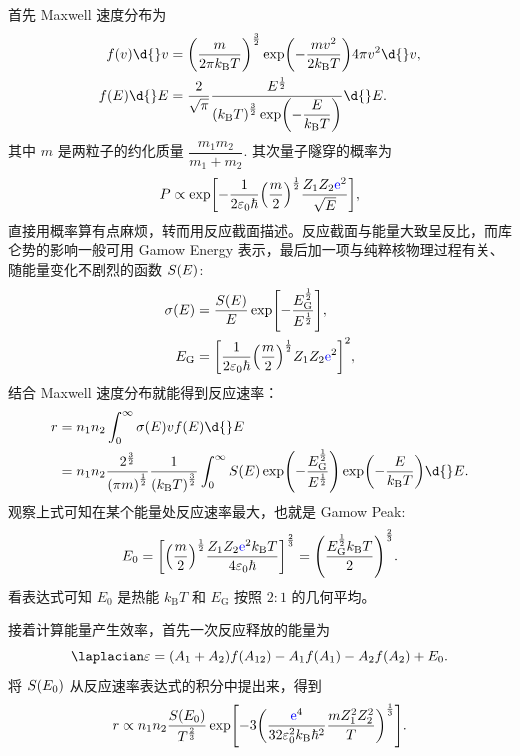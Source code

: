 \documentclass[../天体物理基础.tex]{subfiles}
\begin{document}
首先 Maxwell 速度分布为
\begin{align}
f\mleft(v\mright)\d{}v&=\mleft(\frac{m}{2\pi{}k_{\mathrm{B}}T}\mright)^{\frac{3}{2}}\exp\mleft(-\frac{mv^{2}}{2k_{\mathrm{B}}T}\mright) 4\pi v^{2}\d{}v,\\
f\mleft(E\mright)\d{}E&=\frac{2}{\sqrt{\pi}}\frac{E^{\frac{1}{2}}}{\mleft(k_{\mathrm{B}}T\mright)^{\frac{3}{2}}\exp\mleft(-\dfrac{E}{k_{\mathrm{B}}T}\mright)}\d{}E.
\end{align}
其中 $m$ 是两粒子的约化质量 $\dfrac{m_{1}m_{2}}{m_{1}+m_{2}}$. 其次量子隧穿的概率为
\begin{equation}
P\propto\exp\mleft[-\frac{1}{2\varepsilon_{0}\hbar}\mleft(\frac{m}{2}\mright)^{\frac{1}{2}}\frac{Z_{1}Z_{2}{\color{blue}{\ce{e}}}^{2}}{\sqrt{E}}\mright],
\end{equation}
直接用概率算有点麻烦，转而用反应截面描述。反应截面与能量大致呈反比，而库仑势的影响一般可用 Gamow Energy 表示，最后加一项与纯粹核物理过程有关、随能量变化不剧烈的函数 $S\mleft(E\mright)$:
\begin{align}
\sigma\mleft(E\mright)&=\frac{S\mleft(E\mright)}{E}\exp\mleft[-\frac{E_{\mathrm{G}}^{\frac{1}{2}}}{E^{\frac{1}{2}}}\mright],\\
E_{\mathrm{G}}&=\mleft[\frac{1}{2\varepsilon_{0}\hbar}\mleft(\frac{m}{2}\mright)^{\frac{1}{2}}Z_{1}Z_{2}{\color{blue}{\ce{e}}}^{2}\mright]^{2},
\end{align}
结合 Maxwell 速度分布就能得到反应速率：
\begin{align}
r&=n_{1}n_{2}\int_{0}^{\infty}\sigma\mleft(E\mright) vf\mleft(E\mright)\d{}E\notag\\
&=n_{1}n_{2}\frac{2^{\frac{3}{2}}}{\mleft(\pi m\mright)^{\frac{1}{2}}}\frac{1}{\mleft(k_{\mathrm{B}}T\mright)^{\frac{3}{2}}}\int_{0}^{\infty}S\mleft(E\mright)\exp\mleft(-\frac{E_{\mathrm{G}}^{\frac{1}{2}}}{E^{\frac{1}{2}}}\mright)\exp\mleft(-\frac{E}{k_{\mathrm{B}}T}\mright)\d{}E.
\end{align}
观察上式可知在某个能量处反应速率最大，也就是 Gamow Peak:
\begin{equation}
E_{0}=\mleft[\mleft(\frac{m}{2}\mright)^{\frac{1}{2}}\frac{Z_{1}Z_{2}{\color{blue}{\ce{e}}}^{2}k_{\mathrm{B}}T}{4\varepsilon_{0}\hbar}\mright]^{\frac{2}{3}}=\mleft(\frac{E_{\mathrm{G}}^{\frac{1}{2}}k_{\mathrm{B}}T}{2}\mright)^{\frac{2}{3}}.
\end{equation}
看表达式可知 $E_{0}$ 是热能 $k_{\mathrm{B}}T$ 和 $E_{\mathrm{G}}$ 按照 $2: 1$ 的几何平均。

接着计算能量产生效率，首先一次反应释放的能量为
\begin{equation}
\laplacian\varepsilon=\mleft(A_{1}+A_{2}\mright) f\mleft(A_{12}\mright)-A_{1}f\mleft(A_{1}\mright)-A_{2}f\mleft(A_{2}\mright)+E_{0}.
\end{equation}
将 $S\mleft(E_{0}\mright)$ 从反应速率表达式的积分中提出来，得到
\begin{equation}
r\propto{}n_{1}n_{2}\frac{S\mleft(E_{0}\mright)}{T^{\frac{2}{3}}}\exp\mleft[-3\mleft(\frac{{\color{blue}{\ce{e}}}^{4}}{32\varepsilon_{0}^{2}k_{\mathrm{B}}\hbar^{2}}\frac{mZ_{1}^{2}Z_{2}^{2}}{T}\mright)^{\frac{1}{3}}\mright].
\end{equation}
\end{document}
